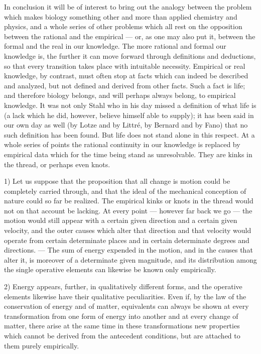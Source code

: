 \documentclass[12pt,a4paper,openany]{book}
\newcommand{\opage}[1]{\marginnote{\footnotesize\textit{[#1]}}}
\begin{document}
In conclusion it will be of interest to bring out the analogy between the
problem which makes biology something other and more than applied chemistry and
physics, and a whole series of other problems which all rest on the opposition
between the rational and the empirical --- or, as one may also put it, between
the formal and the real in our knowledge. The more rational and formal our
knowledge is, the further it can move forward through definitions and
deductions, so that every transition takes place with intuitable necessity.
Empirical or real knowledge, by contrast, must often stop at facts which can
indeed be described and analyzed, but not defined and derived from other facts.
Such a fact is life; and therefore biology belongs, and will perhaps always
belong,
\opage{49}to empirical knowledge. It was not only Stahl who in his day missed a
definition of what life is (a lack which he did, however, believe himself able
to supply); it has been said in our own day as well (by Lotze and by Littré, by
Bernard and by Fano) that no such definition has been found. But life does not
stand alone in this respect. At a whole series of points
the rational continuity in our knowledge is replaced by empirical data which for
the time being stand as unresolvable. They are kinks in the thread, or perhaps
even knots.

1) Let us suppose that the proposition that all change is motion could be
completely carried through, and that the ideal of the mechanical conception of nature
could so far be realized. The empirical kinks or knots in the thread would not
on that account be lacking. At every point --- however far back we go --- the
motion would still appear with a certain given direction and a certain given
velocity, and the outer causes which alter that direction and that velocity
would operate from certain determinate places and in certain determinate degrees
and directions. --- The sum of energy expended in the motion, and in the causes
that alter it, is moreover of a determinate given magnitude, and its distribution
among the single operative elements can likewise be known only empirically.

2) Energy appears, further, in qualitatively different forms, and the operative
elements likewise have their qualitative peculiarities. Even if, by the law of
the conservation of energy and of matter, equivalents can always be shown at
every transformation from one form of energy into another and at every change of
matter, there arise at the same time in these transformations new properties
which cannot be derived from the antecedent conditions, but are attached to them
purely empirically.
\end{document}
